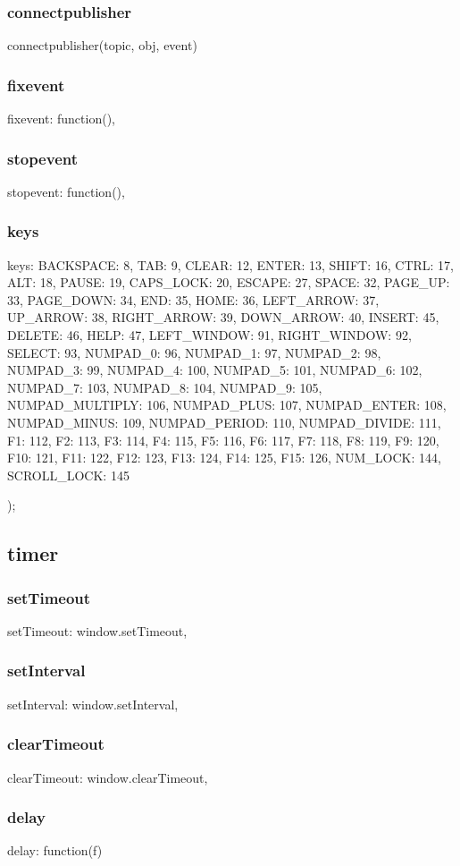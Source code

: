 {{{{{{\subsubsection*{connectpublisher}
connectpublisher(topic, obj, event) {
\subsubsection*{fixevent}
fixevent: function(){},
\subsubsection*{stopevent}
stopevent: function(){},
\subsubsection*{keys}
keys: { BACKSPACE: 8, TAB: 9, CLEAR: 12, ENTER: 13, SHIFT: 16, CTRL: 17, ALT: 18, PAUSE: 19, CAPS_LOCK: 20, 
		    ESCAPE: 27, SPACE: 32, PAGE_UP: 33, PAGE_DOWN: 34, END: 35, HOME: 36, LEFT_ARROW: 37, UP_ARROW: 38,
		    RIGHT_ARROW: 39, DOWN_ARROW: 40, INSERT: 45, DELETE: 46, HELP: 47, LEFT_WINDOW: 91, RIGHT_WINDOW: 92,
		    SELECT: 93, NUMPAD_0: 96, NUMPAD_1: 97, NUMPAD_2: 98, NUMPAD_3: 99, NUMPAD_4: 100, NUMPAD_5: 101,
		    NUMPAD_6: 102, NUMPAD_7: 103, NUMPAD_8: 104, NUMPAD_9: 105, NUMPAD_MULTIPLY: 106, NUMPAD_PLUS: 107,
		    NUMPAD_ENTER: 108, NUMPAD_MINUS: 109, NUMPAD_PERIOD: 110, NUMPAD_DIVIDE: 111, F1: 112, F2: 113, F3: 114,
		    F4: 115, F5: 116, F6: 117, F7: 118, F8: 119, F9: 120, F10: 121, F11: 122, F12: 123, F13: 124, 
		    F14: 125, F15: 126, NUM_LOCK: 144, SCROLL_LOCK: 145 }
    });

\subsection{timer}
\subsubsection*{setTimeout}
setTimeout: window.setTimeout,
\subsubsection*{setInterval}
setInterval: window.setInterval,
\subsubsection*{clearTimeout}
clearTimeout: window.clearTimeout,
\subsubsection*{delay}
delay: function(f) {
}}}}}}}
